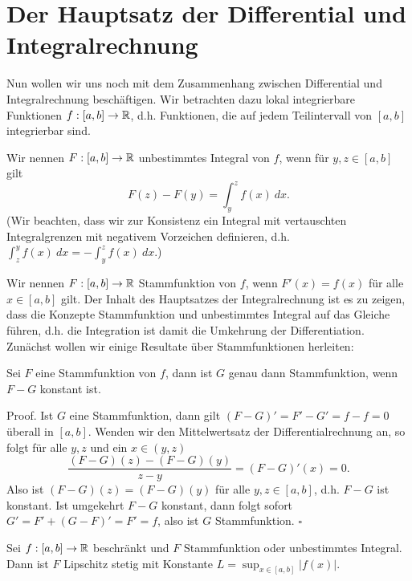 \section{Der Hauptsatz der Differential  und Integralrechnung}
\label{\detokenize{integration/hdi:der-hauptsatz-der-differential-und-integralrechnung}}\label{\detokenize{integration/hdi::doc}}
Nun wollen wir uns noch mit dem Zusammenhang zwischen Differential  und Integralrechnung beschäftigen. Wir betrachten dazu lokal integrierbare Funktionen \(f:[a,b] \rightarrow \mathbb{R}\), d.h. Funktionen, die auf jedem Teilintervall von \([a,b]\) integrierbar sind.

Wir nennen \(F:[a,b] \rightarrow \mathbb{R}\) unbestimmtes Integral von \(f\), wenn für \(y,z \in [a,b]\) gilt
\begin{equation*}
 F(z) - F(y) = \int_y^z f(x)~dx.
\end{equation*}
(Wir beachten, dass wir zur Konsistenz ein Integral mit vertauschten Integralgrenzen mit negativem Vorzeichen definieren, d.h.
\(\int_z^y f(x)~dx = - \int_y^z f(x)~dx. \))

Wir nennen \(F:[a,b] \rightarrow \mathbb{R}\) Stammfunktion von \(f\), wenn \(F'(x)=f(x)\) für alle \(x \in [a,b]\) gilt. Der Inhalt des Hauptsatzes der Integralrechnung ist es zu zeigen, dass die Konzepte Stammfunktion und unbestimmtes Integral auf das Gleiche führen, d.h. die Integration ist damit die Umkehrung der Differentiation.
Zunächst wollen wir einige Resultate über Stammfunktionen herleiten:
\label{integration/hdi:lemma-0}
\begin{lemma}{}{}



Sei \(F\) eine Stammfunktion von \(f\), dann ist \(G\) genau dann Stammfunktion, wenn \(F-G\) konstant ist.
\end{lemma}

\begin{emphBox}{}{}
Proof. Ist \(G\) eine Stammfunktion, dann gilt \((F-G)'=F'-G'= f-f=0\) überall in \([a,b]\). Wenden wir den Mittelwertsatz der Differentialrechnung an, so folgt für alle \(y,z\) und ein \(x \in (y,z)\)
\begin{equation*}
 \frac{(F-G)(z) - (F-G)(y)}{z-y} = (F-G)'(x) = 0.
\end{equation*}
Also ist \((F-G)(z) = (F-G)(y)\) für alle \(y,z \in  [a,b]\), d.h. \(F-G\) ist konstant.
Ist umgekehrt \(F-G\) konstant, dann folgt sofort \(G' = F' + (G-F)' = F'=f\), also ist \(G\) Stammfunktion. \(\square\)
\end{emphBox}
\label{integration/hdi:lemma-1}
\begin{lemma}{}{}



Sei \(f:[a,b]\rightarrow \mathbb{R}\) beschränkt und \(F\) Stammfunktion oder unbestimmtes Integral. Dann ist \(F\) Lipschitz stetig mit Konstante \(L=\sup_{x \in [a,b]} \vert f(x) \vert. \)
\end{lemma}

